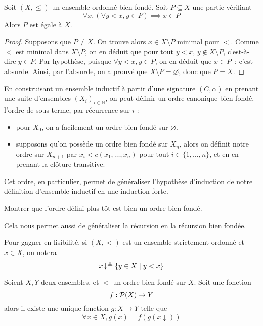 \begin{theorem}
  Soit $(X,\leq)$ un ensemble ordonné bien fondé. Soit $P\subseteq X$ une partie
  vérifiant
  \[\forall x, (\forall y < x, y\in P) \implies x\in P\]
  Alors $P$ est égale à $X$.
\end{theorem}

\begin{proof}
  Supposons que $P\neq X$. On trouve alors $x\in X \setminus P$ minimal pour
  $<$. Comme $<$ est minimal dans $X\setminus P$, on en déduit que pour tout
  $y < x$, $y \notin X\setminus P$, c'est-à-dire $y\in P$. Par hypothèse,
  puisque $\forall y < x, y\in P$, on en déduit que $x\in P$~: c'est absurde.
  Ainsi, par l'absurde, on a prouvé que $X\setminus P = \varnothing$, donc que
  $P = X$.
\end{proof}

\begin{remark}
  En construisant un ensemble inductif à partir d'une signature $(C,\alpha)$ en
  prenant une suite d'ensembles $(X_i)_{i\in \mathbb N}$, on peut définir un ordre
  canonique bien fondé, l'ordre de sous-terme, par récurrence sur $i$ :
  \begin{itemize}
  \item pour $X_0$, on a facilement un ordre bien fondé sur $\varnothing$.
  \item supposons qu'on possède un ordre bien fondé sur $X_n$, alors on définit
    notre ordre sur $X_{n+1}$ par $x_i < c(x_1,\ldots,x_n)$ pour tout
    $i \in \{1,\ldots,n\}$, et en en prenant la clôture transitive.
  \end{itemize}

  Cet ordre, en particulier, permet de généraliser l'hypothèse d'induction de
  notre définition d'ensemble inductif en une induction forte.
\end{remark}

\begin{exercise}
  Montrer que l'ordre défini plus tôt est bien un ordre bien fondé.
\end{exercise}

Cela nous permet aussi de généraliser la récursion en la récursion bien fondée.

\begin{notation}
  Pour gagner en lisibilité, si $(X,<)$ est un ensemble strictement ordonné et
  $x \in X$, on notera
  \[x\!\downarrow \triangleq \{y \in X \mid y < x\}\]
\end{notation}

\begin{theorem}\label{thm.recur.bf}
  Soient $X,Y$ deux ensembles, et $<$ un ordre bien fondé sur $X$. Soit
  une fonction
  \[f : \mathcal{P} (X) \to Y\]
  alors il existe une unique fonction $g : X \to Y$ telle que
  \[\forall x \in X, g(x) = f(g(x\!\downarrow))\]
\end{theorem}

